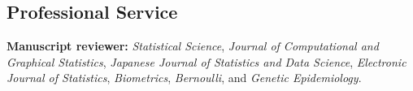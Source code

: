 \documentclass[margin, 10pt]{res}
\begin{document}
\begin{resume}
%
%
\section{Professional Service}
\textbf{Manuscript reviewer:} \textit{Statistical Science}, \textit{Journal of Computational and Graphical Statistics}, \textit{Japanese Journal of Statistics and Data Science}, \textit{Electronic Journal of Statistics}, \textit{Biometrics}, \textit{Bernoulli}, and \textit{Genetic Epidemiology}. 


\end{resume}
\end{document}
